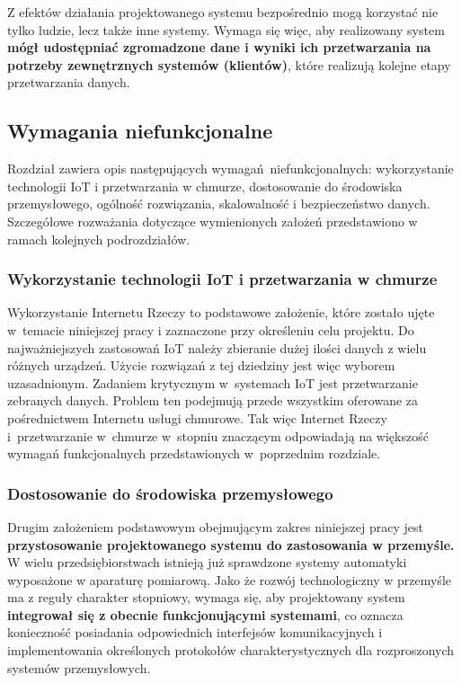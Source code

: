 \documentclass[a4paper, 12pt, twoside]{article}
\begin{document}
Z efektów działania projektowanego systemu bezpośrednio mogą korzystać nie tylko
ludzie, lecz także inne systemy. Wymaga się więc, aby realizowany system \textbf{mógł udostępniać
      zgromadzone dane i wyniki ich przetwarzania na potrzeby zewnętrznych systemów (klientów)},
które realizują kolejne etapy przetwarzania danych.

\subsection{Wymagania niefunkcjonalne}

Rozdział zawiera opis następujących wymagań niefunkcjonalnych:
wykorzystanie technologii IoT i przetwarzania w chmurze, dostosowanie do środowiska
przemysłowego, ogólność rozwiązania, skalowalność i bezpieczeństwo danych. Szczegółowe
rozważania dotyczące wymienionych założeń przedstawiono w ramach kolejnych
podrozdziałów.

\subsubsection{Wykorzystanie technologii IoT i przetwarzania w chmurze}

Wykorzystanie Internetu Rzeczy to podstawowe założenie, które zostało ujęte
w~temacie niniejszej pracy i zaznaczone przy określeniu
celu projektu. Do najważniejszych zastosowań IoT należy zbieranie dużej ilości
danych z wielu różnych urządzeń. Użycie rozwiązań z tej dziedziny jest więc wyborem uzasadnionym.
Zadaniem krytycznym w~systemach IoT jest przetwarzanie zebranych danych.
Problem ten podejmują przede wszystkim oferowane za pośrednictwem Internetu
usługi chmurowe. Tak więc Internet Rzeczy i~przetwarzanie w~chmurze w~stopniu
znaczącym odpowiadają na większość wymagań funkcjonalnych przedstawionych w~poprzednim rozdziale.

\subsubsection{Dostosowanie do środowiska przemysłowego}

Drugim założeniem podstawowym obejmującym zakres niniejszej pracy
jest \textbf{przystosowanie projektowanego systemu do zastosowania w przemyśle.}
W wielu przedsiębiorstwach istnieją już sprawdzone systemy automatyki wyposażone
w aparaturę pomiarową. Jako że rozwój technologiczny w przemyśle ma z reguły
charakter stopniowy, wymaga się, aby projektowany system \textbf{integrował się
      z obecnie funkcjonującymi systemami}, co oznacza konieczność posiadania
odpowiednich interfejsów komunikacyjnych i implementowania określonych protokołów
charakterystycznych dla rozproszonych systemów przemysłowych.
\end{document}
